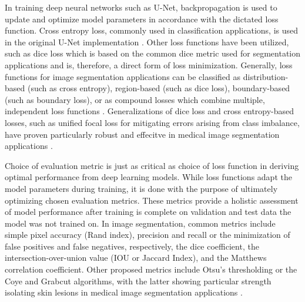 \documentclass{article}
\begin{document}
\begin{multicols}{2}
In training deep neural networks such as U-Net, backpropagation is used to update and optimize model parameters in accordance with the dictated loss function. Cross entropy loss, commonly used in classification applications, is used in the original U-Net implementation \cite{unet_ronneberger2015}. Other loss functions have been utilized, such as dice loss which is based on the common dice metric used for segmentation applications and is, therefore, a direct form of loss minimization. Generally, loss functions for image segmentation applications can be classified as distribution-based (such as cross entropy), region-based (such as dice loss), boundary-based (such as boundary loss), or as compound losses which combine multiple, independent loss functions \cite{comboLoss_taghanaki2019}. Generalizations of dice loss and cross entropy-based losses, such as unified focal loss for mitigating errors arising from class imbalance, have proven particularly robust and effecitve in medical image segmentation applications \cite{unifiedLoss_yeung2022}.
 
Choice of evaluation metric is just as critical as choice of loss function in deriving optimal performance from deep learning models. While loss functions adapt the model parameters during training, it is done with the purpose of ultimately optimizing chosen evaluation metrics. These metrics provide a holistic assessment of model performance after training is complete on validation and test data the model was not trained on. In image segmentation, common metrics include simple pixel accuracy (Rand index), precision and recall or the minimization of false positives and false negatives, respectively, the dice coefficient, the intersection-over-union value (IOU or Jaccard Index), and the Matthews correlation coefficient. Other proposed metrics include Otsu’s thresholding or the Coye and Grabcut algorithms, with the latter showing particular strength isolating skin lesions in medical image segmentation applications \cite{lesionMetrics_2020}. 


\end{multicols}
\end{document}
